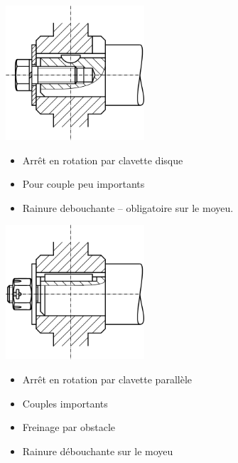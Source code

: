 \documentclass[11pt,oneside]{article}
\begin{document}
\noindent\begin{minipage}[c]{.45\linewidth}
 \begin{center}
  \includegraphics[height=5cm]{png/Fig2}
 \end{center}

\begin{itemize}
\item Arrêt en rotation par clavette disque 
\item Pour couple peu importants
\item Rainure debouchante -- obligatoire sur le moyeu.
\end{itemize}
 \end{minipage} \hfill
\noindent\begin{minipage}[c]{.45\linewidth}
 \begin{center}
  \includegraphics[height=5cm]{png/Fig4}
\end{center}

\begin{itemize}
\item Arrêt en rotation par clavette parallèle
\item Couples importants
\item Freinage par obstacle
\item Rainure débouchante sur le moyeu
\end{itemize}

\end{minipage} 
\end{document}
